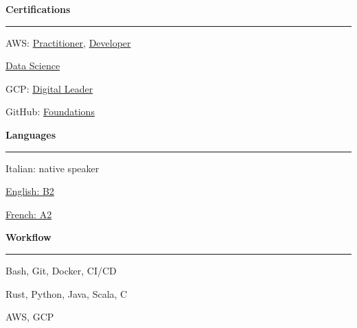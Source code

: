 \documentclass[11pt,letterpaper]{article}
\begin{document}
\begin{justify}
\begin{multicols}{3}
		\textbf{Certifications}\strut
		\hrule
		\begin{itemize}[label={}, itemsep=-5pt, leftmargin=0pt]
			\begin{item}
			      AWS:
			      \href{https://www.credly.com/badges/33614ca6-2f0d-456b-87e9-bf8b8591cbf8/public_url}{Practitioner},
			      \href{https://www.credly.com/badges/e9b6c64c-2175-4345-950b-6331fd88af43/public_url}{Developer}
			\end{item}
			\begin{item}
			      \href{https://dariocurr.github.io/assets/doc/data_science.pdf}{Data Science}
			\end{item}
			\begin{item}
			      GCP:
			      \href{https://www.credential.net/1cd9c397-58b2-4d5d-9755-7277952de891}{Digital Leader}
			\end{item}
			\begin{item}
			      GitHub:
			      \href{https://www.credly.com/badges/0f59d53a-1ecb-4f6f-8a84-96fa3cb55965/public_url}{Foundations}
			\end{item}
		\end{itemize}
		\vspace*{\fill}
		\columnbreak
		\textbf{Languages}\strut
		\hrule
		\begin{itemize}[label={}, itemsep=-5pt, leftmargin=0pt]
			\begin{item}
			      Italian: native speaker
			\end{item}
			\begin{item}
			      \href{https://dariocurr.github.io/assets/doc/B2_english.pdf}{English: B2}
			\end{item}
			\begin{item}
			      \href{https://dariocurr.github.io/assets/doc/A2_french.pdf}{French: A2}
			\end{item}
		\end{itemize}
		\vspace*{\fill}
		\columnbreak
		\textbf{Workflow}\strut
		\hrule
		\begin{itemize}[label={}, itemsep=-5pt, leftmargin=0pt]
			\begin{item}
			      Bash, Git, Docker, CI/CD
			\end{item}
			\begin{item}
			      Rust, Python, Java, Scala, C
			\end{item}
			\begin{item}
			      AWS, GCP
			\end{item}
		\end{itemize}
		\vspace*{\fill}
	\end{multicols}
\end{justify}
\end{document}
